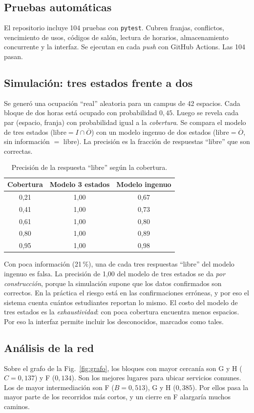 \documentclass[conference,a4paper]{IEEEtran}
\begin{document}
\subsection{Pruebas automáticas}
El repositorio incluye 104 pruebas con \texttt{pytest}. Cubren franjas, conflictos,
vencimiento de usos, códigos de salón, lectura de horarios, almacenamiento
concurrente y la interfaz. Se ejecutan en cada \emph{push} con GitHub Actions. Las 104
pasan.

\subsection{Simulación: tres estados frente a dos}
Se generó una ocupación ``real'' aleatoria para un campus de 42 espacios. Cada bloque
de dos horas está ocupado con probabilidad $0{,}45$. Luego se revela cada par
(espacio, franja) con probabilidad igual a la \emph{cobertura}. Se compara el modelo
de tres estados ($\text{libre}=I\cap\overline{O}$) con un modelo ingenuo de dos
estados ($\text{libre}=\overline{O}$, sin información $=$ libre). La precisión es la
fracción de respuestas ``libre'' que son correctas.

\begin{table}[h]
\centering
\caption{Precisión de la respuesta ``libre'' según la cobertura.}
\label{tab:sim}
\begin{tabular}{@{}ccc@{}}
\toprule
Cobertura & Modelo 3 estados & Modelo ingenuo \\
\midrule
0,21 & 1,00 & 0,67 \\
0,41 & 1,00 & 0,73 \\
0,61 & 1,00 & 0,80 \\
0,80 & 1,00 & 0,89 \\
0,95 & 1,00 & 0,98 \\
\bottomrule
\end{tabular}
\end{table}

Con poca información (21\,\%), una de cada tres respuestas ``libre'' del modelo
ingenuo es falsa. La precisión de 1,00 del modelo de tres estados se da \emph{por
construcción}, porque la simulación supone que los datos confirmados son correctos.
En la práctica el riesgo está en las confirmaciones erróneas, y por eso el sistema
cuenta cuántos estudiantes reportan lo mismo. El costo del modelo de tres estados es
la \emph{exhaustividad}: con poca cobertura encuentra menos espacios. Por eso la
interfaz permite incluir los desconocidos, marcados como tales.

\subsection{Análisis de la red}
Sobre el grafo de la Fig.~\ref{fig:grafo}, los bloques con mayor cercanía son G y H
($C=0{,}137$) y F ($0{,}134$). Son los mejores lugares para ubicar servicios comunes.
Los de mayor intermediación son F ($B=0{,}513$), G y H ($0{,}385$). Por ellos pasa la
mayor parte de los recorridos más cortos, y un cierre en F alargaría muchos caminos.
\end{document}
